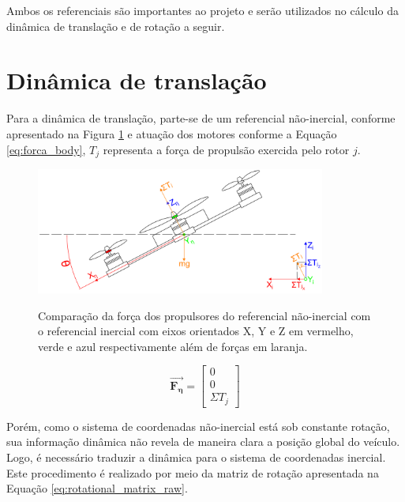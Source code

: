 \documentclass[main.tex]{subfiles}
\begin{document}
Ambos os referenciais são importantes ao projeto e serão utilizados no cálculo da dinâmica de translação e de rotação a seguir.

\section{Dinâmica de translação}

Para a dinâmica de translação, parte-se de um referencial não-inercial, conforme apresentado na Figura \ref{fig:ref_frame} e atuação dos motores conforme a Equação \ref{eq:forca_body}, $T_j$ representa a força de propulsão exercida pelo rotor $j$.

\begin{figure}[!h]
    \centering
    \caption{Comparação da força dos propulsores do referencial não-inercial com o referencial inercial com eixos orientados X, Y e Z em vermelho, verde e azul respectivamente além de forças em laranja.}
    \includegraphics[width=0.85\textwidth]{capitulos/modelagem/imgs/ref_frame.png}
    \label{fig:ref_frame}
\end{figure}

\begin{equation}\label{eq:forca_body}
    \boldsymbol{\vec{F_\eta}} = \begin{bmatrix}
        0\\
        0\\
        \Sigma T_j
    \end{bmatrix}
\end{equation}

Porém, como o sistema de coordenadas não-inercial está sob constante rotação, sua informação dinâmica não revela de maneira clara a posição global do veículo. Logo, é necessário traduzir a dinâmica para o sistema de coordenadas inercial. Este procedimento é realizado por meio da matriz de rotação \cite{robotica} apresentada na Equação \ref{eq:rotational_matrix_raw}.
\end{document}
